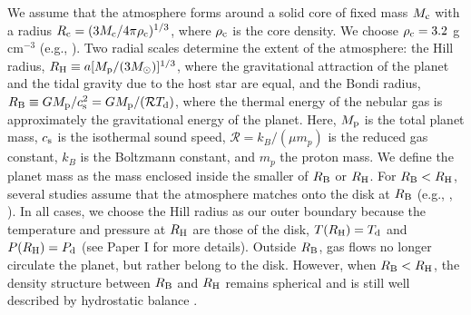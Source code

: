 \documentclass[apj]{emulateapj}
\newcommand{\di}{_{\rm d}}
\begin{document}
We assume that the atmosphere forms around a solid core of fixed mass $M_{\rm c}$ with a radius $R_{\rm c}=(3 M_{\rm c}/4 \pi \rho_{\rm c})^{1/3}$, where $\rho_{\rm c}$ is the core density. We choose $\rho_{\rm c}=3.2$ g cm$^{-3}$ (e.g., \citealt{pap99}). Two radial scales determine the extent of the atmosphere: the Hill radius, $R_{\rm H} \equiv a [M_{\rm p} / (3 M_{\odot})]^{1/3}$, where the gravitational attraction of the planet and the tidal gravity due to the host star are equal, and the Bondi radius, $R_{\rm B} \equiv G M_{\rm p}/c_{\rm s}^2=G M_{\rm p} / (\mathcal{R} T\di)$, where the thermal energy of the nebular gas is approximately the gravitational energy of the planet. Here, $M_{\rm p}$ is the total planet mass, $c_{\rm s}$ is the isothermal sound speed, $\mathcal{R}=k_B/(\mu m_p)$ is the reduced gas constant, $k_B$ is the Boltzmann constant, and $m_p$ the proton mass. We define the planet mass as the mass enclosed inside the smaller of $R_{\rm B}$ or $R_{\rm H}$. For $R_{\rm B}<R_{\rm H}$, several studies assume that the atmosphere matches onto the disk at $R_{\rm B}$ (e.g., \citealt{ikoma00}, \citealt{pollack96}). In all cases, we choose the Hill radius as our outer boundary because the temperature and pressure at $R_{\rm H}$ are those of the disk,  $T(R_{\rm H})=T_{\rm d}$ and $P(R_{\rm H})=P_{\rm d}$ (see Paper I for more details). Outside $R_{\rm B}$, gas flows no longer circulate the planet, but rather belong to the disk. However, when $R_{\rm B}<R_{\rm H}$, the density structure between $R_{\rm B}$ and $R_{\rm H}$ remains spherical and is still well described by hydrostatic balance \citep{ormel13}.  


\end{document}
